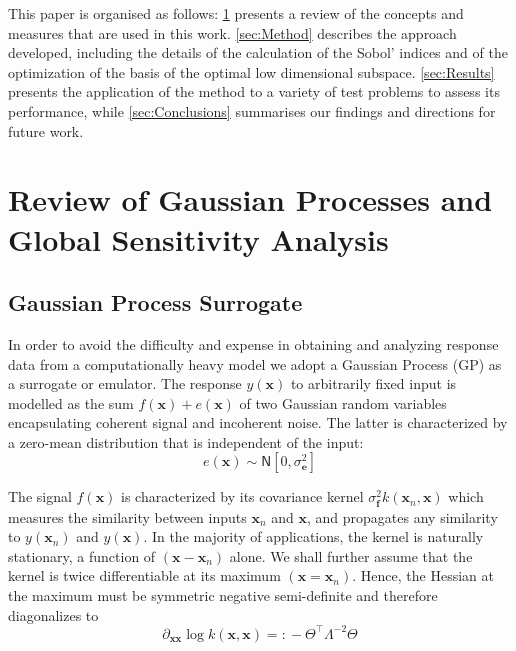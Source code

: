 \documentclass[preprint,12pt]{elsarticle}
\newcommand*{\M}[1]{\ensuremath{#1}\xspace}
\newcommand*{\vr}[1]{\M{\mathbf{#1}}}
\newcommand*{\deqr}{\M{=\mathrel{\mathop:}}}
\newcommand*{\gauss}[2]{\mathsf{N}\!\left\lbrack{} #1 , #2 \right\rbrack}
\begin{document}
This paper is organised as follows: \cref{sec:TheoryReview} presents a review of the concepts and measures that are used in this work. \cref{sec:Method} describes the approach developed, including the details of the calculation of the Sobol' indices and of the optimization of the basis of the optimal low dimensional subspace. \cref{sec:Results} presents the application of the method to a variety of test problems to assess its performance, while \cref{sec:Conclusions} summarises our findings and directions for future work. 

\section{Review of Gaussian Processes and Global Sensitivity Analysis} \label{sec:TheoryReview}
   \subsection{Gaussian Process Surrogate}
            In order to avoid the difficulty and expense in obtaining and analyzing response data from a computationally heavy model we adopt a Gaussian Process (GP) as a surrogate or emulator. The response $y(\vr{x})$ to arbitrarily fixed input is modelled as the sum $f(\vr{x})+e(\vr{x})$ of two Gaussian random variables encapsulating coherent signal and incoherent noise. The latter is characterized by a zero-mean distribution that is independent of the input:
            \begin{equation*}
                e(\vr{x}) \sim \gauss{0}{\sigma^{2}_\vr{e}}
            \end{equation*}

            The signal $f(\vr{x})$ is characterized by its covariance kernel $\sigma^{2}_\vr{f} k(\vr{x}_{n},\vr{x})$ which measures the similarity between inputs $\vr{x}_{n}$ and $\vr{x}$, and propagates any similarity to $y(\vr{x}_{n})$ and $y(\vr{x})$. In the majority of applications, the kernel is naturally stationary, a function of $(\vr{x}-\vr{x}_{n})$ alone. We shall further assume that the kernel is twice differentiable at its maximum $(\vr{x}=\vr{x}_{n})$. Hence, the Hessian at the maximum must be symmetric negative semi-definite and therefore diagonalizes to
            \begin{equation*}
                \partial_{\vr{x}\vr{x}} \log k(\vr{x},\vr{x}) \deqr -\Theta^{\intercal}\Lambda^{-2}\Theta
            \end{equation*}
\end{document}

